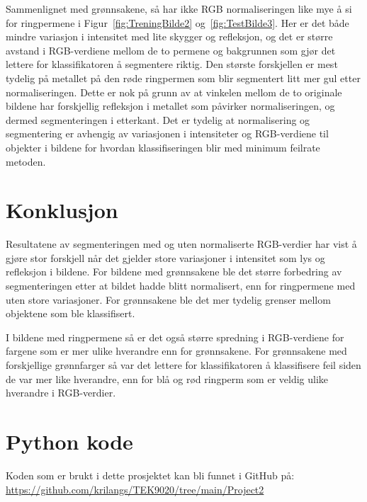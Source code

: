 \documentclass[twocolumn,norwegian]{article}
\begin{document}
	Sammenlignet med grønnsakene, så har ikke RGB normaliseringen like mye å si for ringpermene i Figur~\ref{fig:TreningBilde2} og~\ref{fig:TestBilde3}. Her er det både mindre variasjon i intensitet med lite skygger og refleksjon, og det er større avstand i RGB-verdiene mellom de to permene og bakgrunnen som gjør det lettere for klassifikatoren å segmentere riktig. Den største forskjellen er mest tydelig på metallet på den røde ringpermen som blir segmentert litt mer gul etter normaliseringen. Dette er nok på grunn av at vinkelen mellom de to originale bildene har forskjellig refleksjon i metallet som påvirker normaliseringen, og dermed segmenteringen i etterkant. Det er tydelig at normalisering og segmentering er avhengig av variasjonen i intensiteter og RGB-verdiene til objekter i bildene for hvordan klassifiseringen blir med minimum feilrate metoden.


	\section{Konklusjon}
	Resultatene av segmenteringen med og uten normaliserte RGB-verdier har vist å gjøre stor forskjell når det gjelder store variasjoner i intensitet som lys og refleksjon i bildene. For bildene med grønnsakene ble det større forbedring av segmenteringen etter at bildet hadde blitt normalisert, enn for ringpermene med uten store variasjoner. For grønnsakene ble det mer tydelig grenser mellom objektene som ble klassifisert.
	
	I bildene med ringpermene så er det også større spredning i RGB-verdiene for fargene som er mer ulike hverandre enn for grønnsakene. For grønnsakene med forskjellige grønnfarger så var det lettere for klassifikatoren å klassifisere feil siden de var mer like hverandre, enn for blå og rød ringperm som er veldig ulike hverandre i RGB-verdier.
	
	\appendix
	\section{Python kode}
	\label{Appendix:Kode}
	Koden som er brukt i dette prosjektet kan bli funnet i GitHub på: \url{https://github.com/krilangs/TEK9020/tree/main/Project2}
	
\end{document}
